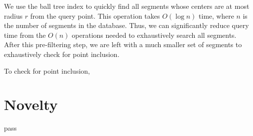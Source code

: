 \documentclass[twocolumn]{extarticle}
\begin{document}
We use the ball tree index to quickly find all segments whose centers are at
most radius $r$ from the query point. This operation takes $O(\log n)$ time,
where $n$ is the number of segments in the database. Thus, we can significantly
reduce query time from the $O(n)$ operations needed to exhaustively search all
segments. After this pre-filtering step, we are left with a much smaller set of
segments to exhaustively check for point inclusion.

To check for point inclusion, 

\section*{Novelty}
pass



\end{document}
